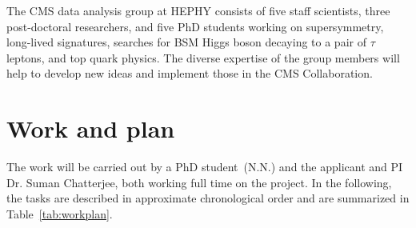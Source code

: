 \documentclass[a4paper,11pt]{article}
\begin{document}
The CMS data analysis group at HEPHY consists of five staff scientists,  three post-doctoral researchers,  and five PhD students working on supersymmetry, long-lived signatures,  searches for BSM Higgs boson decaying to a pair of $\tau$ leptons,  and top quark physics. 
The diverse expertise of the group members will help
to develop new ideas and implement those in the CMS Collaboration.

\section{Work and plan}

The work will be carried out by a PhD student~(N.N.) and the applicant and PI Dr. Suman Chatterjee, both working full time on the project. 
In the following, the tasks are described in approximate chronological order and are summarized in Table~\ref{tab:workplan}.%
\end{document}
